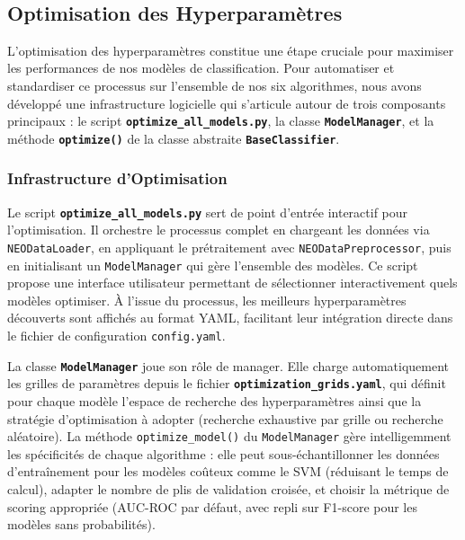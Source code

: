 \documentclass[11pt]{article}
\begin{document}
\begin{center}
\end{center}
{ \hspace*{\fill} \\}

\subsection{Optimisation des
  Hyperparamètres}\label{optimisation-des-hyperparamuxe8tres}

L'optimisation des hyperparamètres constitue une étape cruciale pour
maximiser les performances de nos modèles de classification. Pour
automatiser et standardiser ce processus sur l'ensemble de nos six
algorithmes, nous avons développé une infrastructure logicielle qui
s'articule autour de trois composants principaux : le script
\textbf{\texttt{optimize\_all\_models.py}}, la classe
\textbf{\texttt{ModelManager}}, et la méthode
\textbf{\texttt{optimize()}} de la classe abstraite
\textbf{\texttt{BaseClassifier}}.

\subsubsection{Infrastructure
  d'Optimisation}\label{infrastructure-doptimisation}

Le script \textbf{\texttt{optimize\_all\_models.py}} sert de point
d'entrée interactif pour l'optimisation. Il orchestre le processus
complet en chargeant les données via \texttt{NEODataLoader}, en
appliquant le prétraitement avec \texttt{NEODataPreprocessor}, puis en
initialisant un \texttt{ModelManager} qui gère l'ensemble des modèles.
Ce script propose une interface utilisateur permettant de sélectionner
interactivement quels modèles optimiser. À l'issue du processus, les
meilleurs hyperparamètres découverts sont affichés au format YAML,
facilitant leur intégration directe dans le fichier de configuration
\texttt{config.yaml}.

La classe \textbf{\texttt{ModelManager}} joue son rôle de manager. Elle
charge automatiquement les grilles de paramètres depuis le fichier
\textbf{\texttt{optimization\_grids.yaml}}, qui définit pour chaque
modèle l'espace de recherche des hyperparamètres ainsi que la stratégie
d'optimisation à adopter (recherche exhaustive par grille ou recherche
aléatoire). La méthode \texttt{optimize\_model()} du
\texttt{ModelManager} gère intelligemment les spécificités de chaque
algorithme : elle peut sous-échantillonner les données d'entraînement
pour les modèles coûteux comme le SVM (réduisant le temps de calcul),
adapter le nombre de plis de validation croisée, et choisir la métrique
de scoring appropriée (AUC-ROC par défaut, avec repli sur F1-score pour
les modèles sans probabilités).
\end{document}
